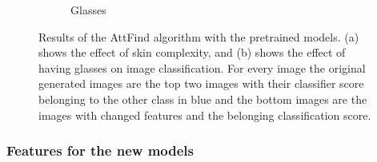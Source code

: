 \begin{figure}[H]
\begin{subfigure}[b]{0.49\textwidth}
     \caption{Glasses}
     \label{fig:Hair_pre}
     \end{subfigure}
     \caption{Results of the AttFind algorithm with the pretrained models. (a) shows the effect of skin complexity, and (b) shows the effect of having glasses on image classification. For every image the original generated images are the top two images with their classifier score belonging to the other class in blue and the bottom images are the images with changed features and the belonging classification score.}
     \label{fig:stylegan2_afhq}
\end{figure}



\subsubsection{Features for the new models}
